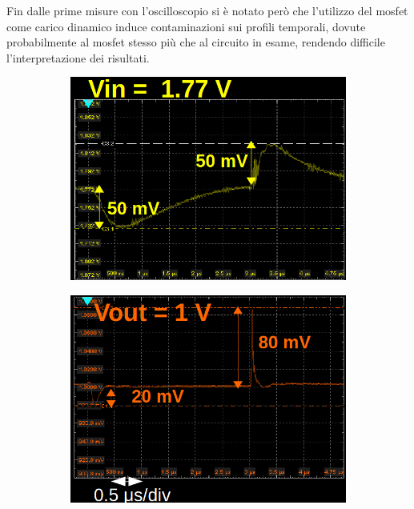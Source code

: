 Fin dalle prime misure con l'oscilloscopio si è notato per\`o che l'utilizzo del mosfet come carico dinamico induce contaminazioni sui profili temporali, dovute probabilmente al mosfet stesso pi\`u che al circuito in esame, rendendo difficile l'interpretazione dei risultati.
\begin{figure}
\begin{subfigure}{.5\textwidth}
  \centering
  \includegraphics[width=.96\linewidth]{Immagini/zoomTransientTest1}
  \caption{ }
  \label{TransientTest:sfig1}
\end{subfigure}%
\begin{subfigure}{.5\textwidth}
  \centering
  \includegraphics[width=.95\linewidth]{Immagini/zoomTransientTest2}
  \caption{ }
  \label{TransientTest:sfig2}
\end{subfigure}

\end{figure}
